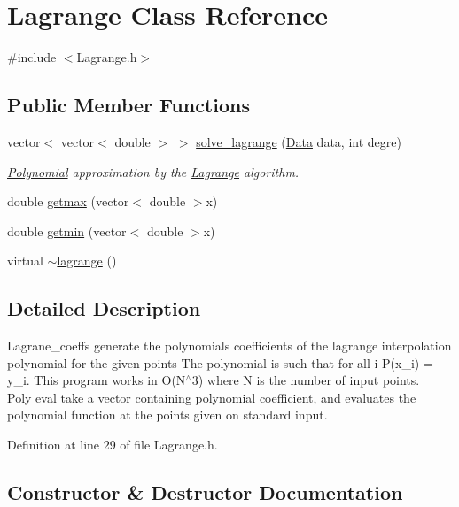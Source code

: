 \hypertarget{class_lagrange}{}\section{Lagrange Class Reference}
\label{class_lagrange}


{\ttfamily \#include $<$Lagrange.\+h$>$}

\subsection*{Public Member Functions}
\begin{DoxyCompactItemize}
\item 
vector$<$ vector$<$ double $>$ $>$ \mbox{\hyperlink{class_lagrange_a800ccde577cdf59701d99ac505f087c4}{solve\+\_\+lagrange}} (\mbox{\hyperlink{struct_data}{Data}} data, int degre)
\begin{DoxyCompactList}\small\item\em \mbox{\hyperlink{class_polynomial}{Polynomial}} approximation by the \mbox{\hyperlink{class_lagrange}{Lagrange}} algorithm. \end{DoxyCompactList}\item 
double \mbox{\hyperlink{class_lagrange_a22e6ca4f6b778698472094238063538f}{getmax}} (vector$<$ double $>$x)
\item 
double \mbox{\hyperlink{class_lagrange_a7eb566fad6ddd9fa7968b3936327ae7c}{getmin}} (vector$<$ double $>$x)
\item 
virtual \mbox{\hyperlink{class_lagrange_afda6181d4464826597b34bc495b49984}{$\sim$lagrange}} ()
\end{DoxyCompactItemize}


\subsection{Detailed Description}
Lagrane\+\_\+coeffs generate the polynomials coefficients of the lagrange interpolation polynomial for the given points The polynomial is such that for all i P(x\+\_\+i) = y\+\_\+i. This program works in O(\+N$^\wedge$3) where N is the number of input points. ~\newline
Poly eval take a vector containing polynomial coefficient, and evaluates the polynomial function at the points given on standard input. 

Definition at line 29 of file Lagrange.\+h.



\subsection{Constructor \& Destructor Documentation}
\mbox{\label{class_lagrange_afda6181d4464826597b34bc495b49984}} 
